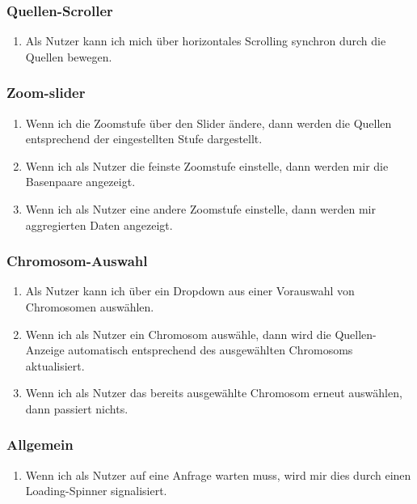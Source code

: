 \documentclass{scrartcl}
\begin{document}
\subsubsection{Quellen-Scroller}
\begin{enumerate}
	\item Als Nutzer kann ich mich über horizontales Scrolling synchron durch die Quellen bewegen.
\end{enumerate}

\subsubsection{Zoom-slider}
\begin{enumerate}
	\item Wenn ich die Zoomstufe über den Slider ändere, dann werden die Quellen entsprechend der eingestellten Stufe dargestellt.
	\item Wenn ich als Nutzer die feinste Zoomstufe einstelle, dann werden mir die Basenpaare angezeigt.
	\item Wenn ich als Nutzer eine andere Zoomstufe einstelle, dann werden mir aggregierten Daten angezeigt.
\end{enumerate}

\subsubsection{Chromosom-Auswahl}
\begin{enumerate}
	\item Als Nutzer kann ich über ein Dropdown aus einer Vorauswahl von Chromosomen auswählen.
	\item Wenn ich als Nutzer ein Chromosom auswähle, dann wird die Quellen-Anzeige automatisch entsprechend des ausgewählten Chromosoms aktualisiert.
	\item Wenn ich als Nutzer das bereits ausgewählte Chromosom erneut auswählen, dann passiert nichts.
\end{enumerate}

\subsubsection{Allgemein}
\begin{enumerate}
	\item Wenn ich als Nutzer auf eine Anfrage warten muss, wird mir dies durch einen Loading-Spinner signalisiert.	
\end{enumerate}
\newpage

\end{document}
